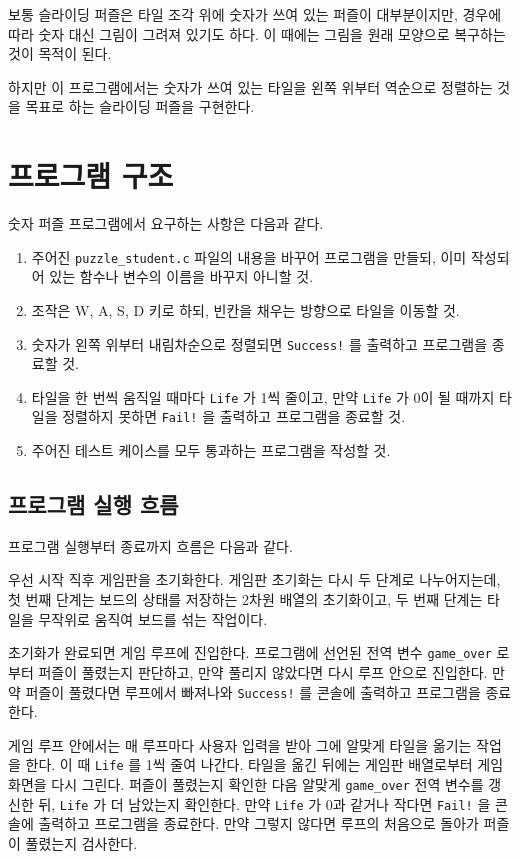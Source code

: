 \documentclass{article}
\newcommand{\code}[1]{
  \texttt{\large{#1}}
}
\begin{document}
보통 슬라이딩 퍼즐은 타일 조각 위에 숫자가 쓰여 있는 퍼즐이 대부분이지만, 경우에 따라 숫자 대신 그림이 그려져 있기도 하다. 이 때에는 그림을 원래 모양으로 복구하는 것이 목적이 된다.

하지만 이 프로그램에서는 숫자가 쓰여 있는 타일을 왼쪽 위부터 역순으로 정렬하는 것을 목표로 하는 슬라이딩 퍼즐을 구현한다.

\section{프로그램 구조}

숫자 퍼즐 프로그램에서 요구하는 사항은 다음과 같다.

\begin{enumerate}
\item 주어진 \code{puzzle\_student.c} 파일의 내용을 바꾸어 프로그램을 만들되, 이미 작성되어 있는 함수나 변수의 이름을 바꾸지 아니할 것.
\item 조작은 W, A, S, D 키로 하되, 빈칸을 채우는 방향으로 타일을 이동할 것.
\item 숫자가 왼쪽 위부터 내림차순으로 정렬되면 \code{Success!}를 출력하고 프로그램을 종료할 것.
\item 타일을 한 번씩 움직일 때마다 \code{Life}가 1씩 줄이고, 만약 \code{Life}가 0이 될 때까지 타일을 정렬하지 못하면 \code{Fail!}을 출력하고 프로그램을 종료할 것.
\item 주어진 테스트 케이스를 모두 통과하는 프로그램을 작성할 것.
\end{enumerate}

\subsection{프로그램 실행 흐름}

프로그램 실행부터 종료까지 흐름은 다음과 같다.

우선 시작 직후 게임판을 초기화한다. 게임판 초기화는 다시 두 단계로 나누어지는데, 첫 번째 단계는 보드의 상태를 저장하는 2차원 배열의 초기화이고, 두 번째 단계는 타일을 무작위로 움직여 보드를 섞는 작업이다.

초기화가 완료되면 게임 루프에 진입한다. 프로그램에 선언된 전역 변수 \code{game\_over}로부터 퍼즐이 풀렸는지 판단하고, 만약 풀리지 않았다면 다시 루프 안으로 진입한다. 만약 퍼즐이 풀렸다면 루프에서 빠져나와 \code{Success!}를 콘솔에 출력하고 프로그램을 종료한다.

게임 루프 안에서는 매 루프마다 사용자 입력을 받아 그에 알맞게 타일을 옮기는 작업을 한다. 이 때 \code{Life}를 1씩 줄여 나간다. 타일을 옮긴 뒤에는 게임판 배열로부터 게임 화면을 다시 그린다. 퍼즐이 풀렸는지 확인한 다음 알맞게 \code{game\_over} 전역 변수를 갱신한 뒤, \code{Life}가 더 남았는지 확인한다. 만약 \code{Life}가 0과 같거나 작다면 \code{Fail!}을 콘솔에 출력하고 프로그램을 종료한다. 만약 그렇지 않다면 루프의 처음으로 돌아가 퍼즐이 풀렸는지 검사한다.
\end{document}
